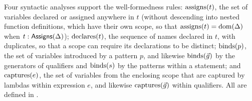 Four syntactic analyses support the well-formedness rules: $\mathrm{assigns}(t)$, the set of variables declared or assigned
anywhere in $t$ (without descending into nested function definitions, which have their own scope, so that
$\mathrm{assigns}(t) = \mathrm{dom}(\Delta)$ when $t : \mathsf{Assigns}(\Delta)$); $\mathrm{declares}(t)$, the sequence of names declared in $t$, with
duplicates, so that a scope can require its declarations to be distinct; $\mathrm{binds}(p)$, the set of variables introduced by a
pattern $p$, and likewise $\binds(\seq{g})$ by the generators of qualifiers and $\mathrm{binds}(s)$ by the patterns within a statement; and $\mathrm{captures}(e)$, the
set of variables from the enclosing scope that are captured by lambdas within expression $e$, and likewise
$\captures(\seq{g})$ within qualifiers.
All are defined in .
